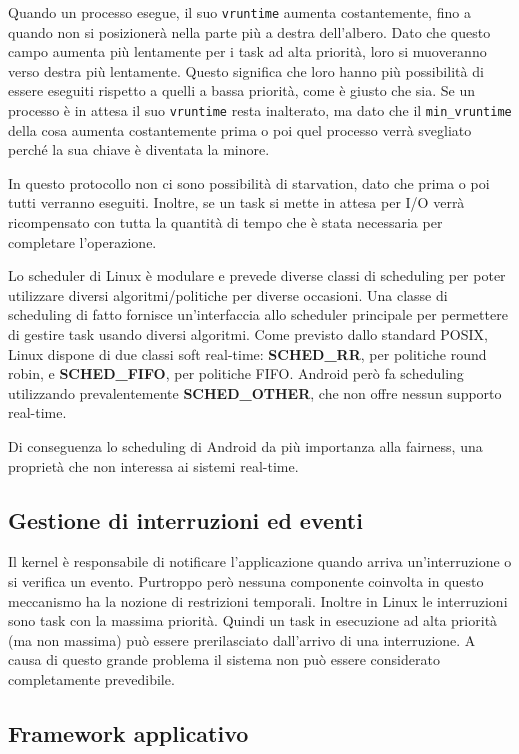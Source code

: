 Quando un processo esegue, il suo \texttt{vruntime} aumenta costantemente, fino a quando non si posizionerà nella parte più a destra dell'albero. Dato che questo campo aumenta più lentamente per i task ad alta priorità, loro si muoveranno verso destra più lentamente. Questo significa che loro hanno più possibilità di essere eseguiti rispetto a quelli a bassa priorità, come è giusto che sia. Se un processo è in attesa il suo \texttt{vruntime} resta inalterato, ma dato che il \texttt{min\_vruntime} della cosa aumenta costantemente prima o poi quel processo verrà svegliato perché la sua chiave è diventata la minore. 

In questo protocollo non ci sono possibilità di starvation, dato che prima o poi tutti verranno eseguiti. Inoltre, se un task si mette in attesa per I/O verrà ricompensato con tutta la quantità di tempo che è stata necessaria per completare l'operazione. 

Lo scheduler di Linux è modulare e prevede diverse classi di scheduling per poter utilizzare diversi algoritmi/politiche per diverse occasioni. Una classe di scheduling di fatto fornisce un'interfaccia allo scheduler principale per permettere di gestire task usando diversi algoritmi. Come previsto dallo standard POSIX, Linux dispone di due classi soft real-time: \textbf{SCHED\_RR}, per politiche round robin, e \textbf{SCHED\_FIFO}, per politiche FIFO. Android però fa scheduling utilizzando prevalentemente \textbf{SCHED\_OTHER}, che non offre nessun supporto real-time.

Di conseguenza lo scheduling di Android da più importanza alla fairness, una proprietà che non interessa ai sistemi real-time. 

\subsection{Gestione di interruzioni ed eventi}
Il kernel è responsabile di notificare l'applicazione quando arriva un'interruzione o si verifica un evento. Purtroppo però nessuna componente coinvolta in questo meccanismo ha la nozione di restrizioni temporali. Inoltre in Linux le interruzioni sono task con la massima priorità. Quindi un task in esecuzione ad alta priorità (ma non massima) può essere prerilasciato dall'arrivo di una interruzione. A causa di questo grande problema il sistema non può essere considerato completamente prevedibile.

\subsection{Framework applicativo}
